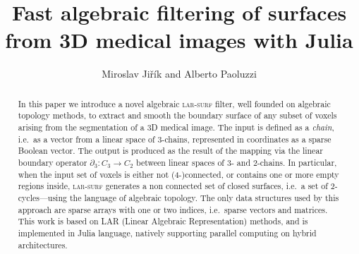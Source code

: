 \documentclass[11pt, oneside]{article}   	%
\title{Fast algebraic filtering of surfaces from 3D medical images with Julia}
\author{Miroslav Ji\v{r}\'ik and Alberto Paoluzzi}
\date{}							%
\begin{document}
\maketitle

\begin{abstract}
In this paper we introduce a novel algebraic \textsc{lar-surf} filter, well founded on algebraic topology methods, to extract and smooth the boundary surface of any subset of voxels arising from the segmentation of a 3D medical image. The input is defined as a \emph{chain}, i.e.~as a vector from a linear space of 3-chains, represented in coordinates as a sparse Boolean vector. The output is produced as the result of the mapping via the linear boundary operator $\partial_3:C_3 \to C_2$ between linear spaces of 3- and 2-chains.  In particular, when the input set of voxels is either not (4-)connected, or contains one or more empty regions inside, \textsc{lar-surf} generates a non connected set of closed surfaces, i.e.~a set of 2-cycles---using the language of algebraic topology. The only data structures used by this approach are sparse arrays with one or two indices, i.e.~sparse vectors and matrices. This work is based on LAR (Linear Algebraic Representation) methods, and is implemented in Julia language, natively supporting parallel computing on hybrid architectures.
\end{abstract}

\tableofcontents







\end{document}

